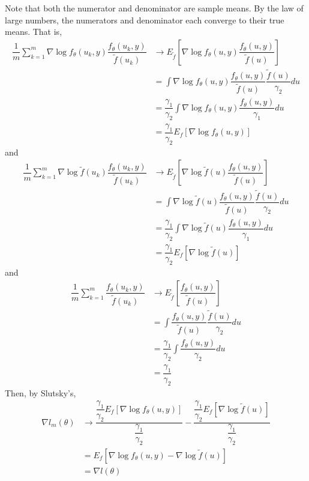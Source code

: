 \documentclass{article}
\begin{document}
 Note that both the numerator and denominator are sample means. By the law of large numbers, the numerators and denominator  each converge to their true means. That is,
\begin{align}
\dfrac{1}{m}\sum_{k=1}^m \nabla \log f_\theta (u_k,y)  \dfrac{f_\theta(u_k,y)}{\tilde{f}(u_k)} &\rightarrow  E_{\tilde{f}} \left[ \nabla \log f_\theta (u,y)  \dfrac{f_\theta(u,y)}{\tilde{f}(u)}  \right] \\
&= \int \nabla \log f_\theta (u,y)  \dfrac{f_\theta(u,y)}{\tilde{f}(u)} \dfrac{\tilde{f}(u)}{\gamma_2} du\\
&= \dfrac{\gamma_1}{\gamma_2} \int \nabla \log f_\theta (u,y)  \dfrac{f_\theta(u,y)}{\gamma_1}  du \\
&=\dfrac{\gamma_1}{\gamma_2} E_f \left[ \nabla \log f_\theta(u,y)  \right]
\end{align}
and
\begin{align}
\dfrac{1}{m}\sum_{k=1}^m \nabla \log \tilde{f}(u_k)  \dfrac{f_\theta(u_k,y)}{\tilde{f}(u_k)} &\rightarrow  E_{\tilde{f}} \left[ \nabla \log \tilde{f}(u)  \dfrac{f_\theta(u,y)}{\tilde{f}(u)}  \right] \\
&= \int \nabla \log \tilde{f}(u)  \dfrac{f_\theta(u,y)}{\tilde{f}(u)} \dfrac{\tilde{f}(u)}{\gamma_2} du\\
&= \dfrac{\gamma_1}{\gamma_2} \int \nabla \log \tilde{f}(u)  \dfrac{f_\theta(u,y)}{\gamma_1}  du \\
&=\dfrac{\gamma_1}{\gamma_2} E_f \left[ \nabla \log \tilde{f}(u)  \right]
\end{align}
and
\begin{align}
\dfrac{1}{m}\sum_{k=1}^m \dfrac{f_\theta(u_k,y)}{\tilde{f}(u_k)} &\rightarrow E_{\tilde{f}} \left[ \dfrac{f_\theta(u,y)}{\tilde{f}(u)}  \right] \\
&= \int \dfrac{f_\theta(u,y)}{\tilde{f}(u)} \dfrac{\tilde{f}(u)}{\gamma_2} du\\
&= \dfrac{\gamma_1}{\gamma_2} \int \dfrac{ f_\theta(u,y)}{\gamma_2} du \\
&= \dfrac{\gamma_1}{\gamma_2}
\end{align}
Then, by Slutsky's,
\begin{align}
\nabla l_m(\theta)&\rightarrow \dfrac{  \dfrac{\gamma_1}{\gamma_2} E_f \left[ \nabla \log f_\theta(u,y)  \right] }{\dfrac{\gamma_1}{\gamma_2}}-\dfrac{  \dfrac{\gamma_1}{\gamma_2} E_f \left[ \nabla \log \tilde{f}(u)  \right] }{\dfrac{\gamma_1}{\gamma_2}}\\
&=  E_f \left[ \nabla \log f_\theta(u,y) - \nabla \log \tilde{f}(u)  \right] \\
&=\nabla l(\theta)
\end{align}
\end{document}
